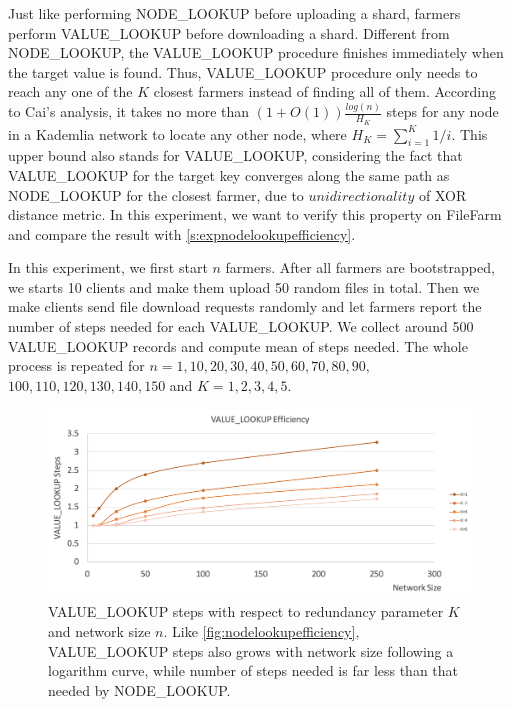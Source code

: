 Just like performing NODE\_LOOKUP before uploading a shard, farmers perform VALUE\_LOOKUP before downloading a shard. Different from NODE\_LOOKUP, the VALUE\_LOOKUP procedure finishes immediately when the target value is found. Thus, VALUE\_LOOKUP procedure only needs to reach any one of the $K$ closest farmers instead of finding all of them. According to Cai's analysis\cite{cai2013probabilistic}, it takes no more than $(1+O(1))\frac{log(n)}{H_{K}}$ steps for any node in a Kademlia network to locate any other node, where $H_K = \sum_{i=1}^{K} 1/i$. This upper bound also stands for VALUE\_LOOKUP, considering the fact that VALUE\_LOOKUP for the target key converges along the same path as NODE\_LOOKUP for the closest farmer, due to $unidirectionality$ of XOR distance metric. In this experiment, we want to verify this property on FileFarm and compare the result with \ref{s:expnodelookupefficiency}.

In this experiment, we first start $n$ farmers. After all farmers are bootstrapped, we starts 10 clients and make them upload 50 random files in total. Then we make clients send file download requests randomly and let farmers report the number of steps needed for each VALUE\_LOOKUP. We collect around 500 VALUE\_LOOKUP records and compute mean of steps needed. The whole process is repeated for  $n=1,10,20,30,40,50,60,70,80,90,$ $100,110,120,130,140,150$ and $K=1,2,3,4,5$.

\begin{figure}[hbt]
\centering
  \includegraphics[width=14cm]{charts/chart_value_lookup_efficiency.png}
  \caption[VALUE\_LOOKUP steps with respect to $K$ and network size $n$]{VALUE\_LOOKUP steps with respect to redundancy parameter $K$ and network size $n$. Like \ref{fig:nodelookupefficiency}, VALUE\_LOOKUP steps also grows with network size following a logarithm curve, while number of steps needed is far less than that needed by NODE\_LOOKUP.}
  \label{fig:valuelookupefficiency}
\end{figure}

